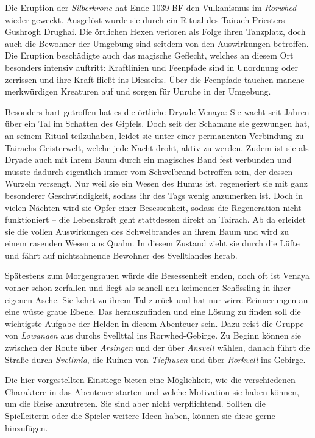 \spaltenanfang



Die Eruption der \emph{Silberkrone} hat Ende 1039 BF den Vulkanismus im \emph{Rorwhed} wieder geweckt.
Ausgelöst wurde sie durch ein Ritual des Tairach-Priesters Gushrogh Drughai.
Die örtlichen Hexen verloren als Folge ihren Tanzplatz, doch auch die Bewohner der Umgebung sind seitdem von den Auswirkungen betroffen.
Die Eruption beschädigte auch das magische Geflecht, welches an diesem Ort besonders intensiv auftritt:
Kraftlinien und Feenpfade sind in Unordnung oder zerrissen und ihre Kraft fließt ins Diesseits.
Über die Feenpfade tauchen manche merkwürdigen Kreaturen auf und sorgen für Unruhe in der Umgebung.


Besonders hart getroffen hat es die örtliche Dryade Venaya:
Sie wacht seit Jahren über ein Tal im Schatten des Gipfels.
Doch seit der Schamane sie gezwungen hat, an seinem Ritual teilzuhaben, leidet sie unter einer permanenten Verbindung zu Tairachs Geisterwelt, welche jede Nacht droht, aktiv zu werden.
Zudem ist sie als Dryade auch mit ihrem Baum durch ein magisches Band fest verbunden und müsste dadurch eigentlich immer vom Schwelbrand betroffen sein, der dessen Wurzeln versengt.
Nur weil sie ein Wesen des Humus ist, regeneriert sie mit ganz besonderer Geschwindigkeit, sodass ihr des Tags wenig anzumerken ist.
Doch in vielen Nächten wird sie Opfer einer Besessenheit, sodass die Regeneration nicht funktioniert -- die Lebenskraft geht stattdessen direkt an Tairach.
Ab da erleidet sie die vollen Auswirkungen des Schwelbrandes an ihrem Baum und wird zu einem rasenden Wesen aus Qualm.
In diesem Zustand zieht sie durch die Lüfte und fährt auf nichtsahnende Bewohner des Svelltlandes herab.

Spätestens zum Morgengrauen würde die Besessenheit enden, doch oft ist Venaya vorher schon zerfallen und liegt als schnell neu keimender Schössling in ihrer eigenen Asche.
Sie kehrt zu ihrem Tal zurück und hat nur wirre Erinnerungen an eine wüste graue Ebene.
Das herauszufinden und eine Lösung zu finden soll die wichtigste Aufgabe der Helden in diesem Abenteuer sein.
Dazu reist die Gruppe von \emph{Lowangen} aus durchs Svellttal ins Rorwhed-Gebirge.
Zu Beginn können sie zwischen der Route über \emph{Arsingen} und der über \emph{Ansvell} wählen, danach führt die Straße durch \emph{Svellmia}, die Ruinen von \emph{Tiefhusen} und über \emph{Rorkvell} ins Gebirge.


Die hier vorgestellten Einstiege bieten eine Möglichkeit, wie die verschiedenen Charaktere in das Abenteuer starten und welche Motivation sie haben können, um die Reise anzutreten.
Sie sind aber nicht verpflichtend.
Sollten die Spielleiterin oder die Spieler weitere Ideen haben, können sie diese gerne hinzufügen.


